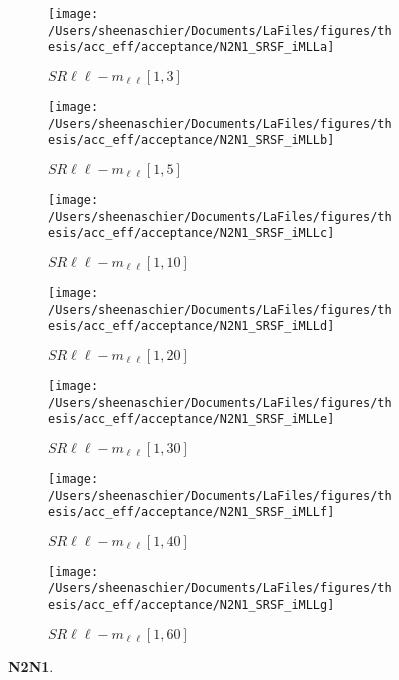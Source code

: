 \begin{figure}
        \centering
    \begin{subfigure}[b]{0.49\textwidth}
        \texttt{[image: /Users/sheenaschier/Documents/LaFiles/figures/thesis/acc\_eff/acceptance/N2N1\_SRSF\_iMLLa]}
    \caption{$SR\ell\ell-m_{\ell\ell} [1, 3]$}
    \end{subfigure}
    \begin{subfigure}[b]{0.49\textwidth}
        \texttt{[image: /Users/sheenaschier/Documents/LaFiles/figures/thesis/acc\_eff/acceptance/N2N1\_SRSF\_iMLLb]}
    \caption{$SR\ell\ell-m_{\ell\ell} [1, 5]$}
    \end{subfigure}
    \begin{subfigure}[b]{0.49\textwidth}
        \texttt{[image: /Users/sheenaschier/Documents/LaFiles/figures/thesis/acc\_eff/acceptance/N2N1\_SRSF\_iMLLc]}
    \caption{$SR\ell\ell-m_{\ell\ell} [1, 10]$}
    \end{subfigure}
    \begin{subfigure}[b]{0.49\textwidth}
        \texttt{[image: /Users/sheenaschier/Documents/LaFiles/figures/thesis/acc\_eff/acceptance/N2N1\_SRSF\_iMLLd]}
    \caption{$SR\ell\ell-m_{\ell\ell} [1, 20]$}
    \end{subfigure}
    \begin{subfigure}[b]{0.49\textwidth}
        \texttt{[image: /Users/sheenaschier/Documents/LaFiles/figures/thesis/acc\_eff/acceptance/N2N1\_SRSF\_iMLLe]}
    \caption{$SR\ell\ell-m_{\ell\ell} [1, 30]$}
    \end{subfigure}
    \begin{subfigure}[b]{0.49\textwidth}
        \texttt{[image: /Users/sheenaschier/Documents/LaFiles/figures/thesis/acc\_eff/acceptance/N2N1\_SRSF\_iMLLf]}
    \caption{$SR\ell\ell-m_{\ell\ell} [1, 40]$}
    \end{subfigure}
    \begin{subfigure}[b]{0.49\textwidth}
        \texttt{[image: /Users/sheenaschier/Documents/LaFiles/figures/thesis/acc\_eff/acceptance/N2N1\_SRSF\_iMLLg]}
    \caption{$SR\ell\ell-m_{\ell\ell} [1, 60]$}
    \end{subfigure}
    \caption{\textbf{N2N1}.}
\end{figure}

